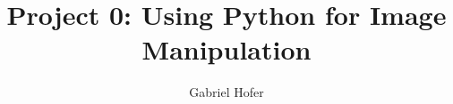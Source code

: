 \documentclass[12pt]{article}
\begin{document}
\title{Project 0: Using Python for Image Manipulation}%
\author{Gabriel Hofer} 
\maketitle




\pagebreak
\end{document}
